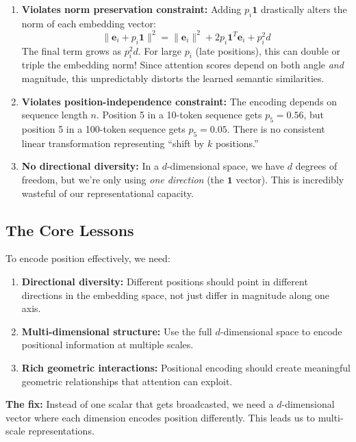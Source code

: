 \documentclass{article}
\begin{document}
\begin{enumerate}
\item \textbf{Violates norm preservation constraint:} Adding $p_i \mathbf{1}$ drastically alters the norm of each embedding vector:
\[
\|\mathbf{e}_i + p_i \mathbf{1}\|^2 = \|\mathbf{e}_i\|^2 + 2p_i \mathbf{1}^T \mathbf{e}_i + p_i^2 d
\]
The final term grows as $p_i^2 d$. For large $p_i$ (late positions), this can double or triple the embedding norm! Since attention scores depend on both angle \textit{and} magnitude, this unpredictably distorts the learned semantic similarities.

\item \textbf{Violates position-independence constraint:} The encoding depends on sequence length $n$. Position 5 in a 10-token sequence gets $p_5 = 0.56$, but position 5 in a 100-token sequence gets $p_5 = 0.05$. There is no consistent linear transformation representing ``shift by $k$ positions.''

\item \textbf{No directional diversity:} In a $d$-dimensional space, we have $d$ degrees of freedom, but we're only using \emph{one direction} (the $\mathbf{1}$ vector). This is incredibly wasteful of our representational capacity.
\end{enumerate}

\subsection{The Core Lessons}

\begin{tcolorbox}[colback=yellow!5!white, colframe=orange!50!black, title=What We Learned]
To encode position effectively, we need:
\begin{enumerate}
\item \textbf{Directional diversity:} Different positions should point in different directions in the embedding space, not just differ in magnitude along one axis.

\item \textbf{Multi-dimensional structure:} Use the full $d$-dimensional space to encode positional information at multiple scales.

\item \textbf{Rich geometric interactions:} Positional encoding should create meaningful geometric relationships that attention can exploit.
\end{enumerate}

\textbf{The fix:} Instead of one scalar that gets broadcasted, we need a $d$-dimensional vector where each dimension encodes position differently. This leads us to multi-scale representations.
\end{tcolorbox}
\end{document}
